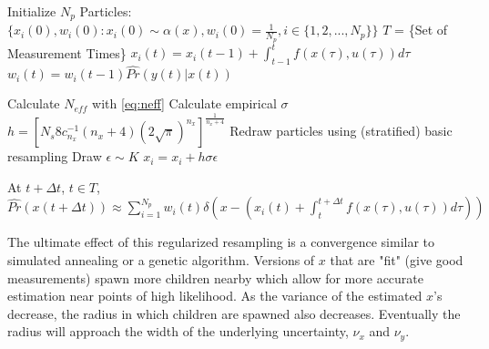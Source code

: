  \begin{algorithmic}
\STATE Initialize $N_p$ Particles: 
        $\{x_i(0),w_i(0) : x_i(0) \sim \alpha(x), w_i(0) = \frac{1}{N_p}, i \in \{1, 2, ... , N_p\} \}$
\STATE $T$ = \{Set of Measurement Times\}
        \STATE $x_i(t) = x_i(t-1) + \int_{t-1}^t f(x(\tau), u(\tau)) d\tau $
        \STATE $w_i(t) = w_i(t-1)\hat{Pr}(y(t) | x(t))$
    \ENDFOR

    \STATE Calculate $N_{eff}$ with \autoref{eq:neff}
        \STATE Calculate empirical $\sigma$ 
        \STATE $h = [N_s8c^{-1}_{n_x}(n_x + 4)(2\sqrt{\pi})^{n_x}]^{\frac{1}{n_x +4}}$
        \STATE Redraw particles using (stratified) basic resampling
            \STATE Draw $\epsilon \sim K$
            \STATE $x_i = x_i + h \sigma \epsilon$
        \ENDFOR
    \ENDIF
\ENDFOR

\STATE At $t + \Delta t$, $t \in T$, $\hat{Pr}(x(t+\Delta t)) \approx 
\sum_{i=1}^{N_p} w_i(t)\delta\left(x - (x_i(t) + \int_t^{t+\Delta t} f(x(\tau), u(\tau)) d\tau) \right)$

 \end{algorithmic}

The ultimate effect of this regularized resampling is a convergence similar to simulated annealing
or a genetic algorithm. Versions of $x$ that are "fit" (give good measurements) spawn more children 
nearby which allow for more accurate estimation near points of high likelihood. 
As the variance of the estimated
$x$'s decrease, the radius in which children are spawned also decreases. Eventually the radius
will approach the width of the underlying uncertainty, $\nu_x$ and $\nu_y$.

